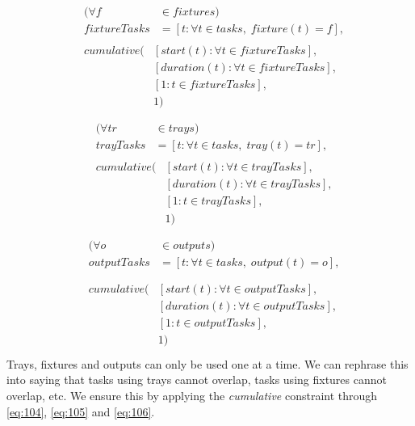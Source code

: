  \begin{equation}
 \begin{aligned}\label{eq:104}
 &\begin{aligned}
 (\forall f &\in fixtures) \\
 fixtureTasks &= [t : \forall t \in tasks, \; fixture(t) = f], 
 \end{aligned}\\
 &\begin{aligned}
 cumulative(&[start(t) : \forall t \in fixtureTasks],\\
 &[duration(t) : \forall t \in fixtureTasks],\\
 &[1 : t \in fixtureTasks],\\
 &1)
 \end{aligned}\\
 \end{aligned}
 \end{equation}
 \begin{equation}
 \begin{aligned}\label{eq:105}
 &\begin{aligned}
 (\forall tr &\in trays) \\
 trayTasks &= [t : \forall t \in tasks, \; tray(t) = tr], 
 \end{aligned}\\
 &\begin{aligned}
 cumulative(&[start(t) : \forall t \in trayTasks],\\
 &[duration(t) : \forall t \in trayTasks],\\
 &[1 : t \in trayTasks],\\
 &1)
 \end{aligned}\\
 \end{aligned}
 \end{equation}
 \begin{equation}
 \begin{aligned}\label{eq:106}
 &\begin{aligned}
 (\forall o &\in outputs) \\
 outputTasks &= [t : \forall t \in tasks, \; output(t) = o], \\
 \end{aligned}\\
 &\begin{aligned}
 cumulative(&[start(t) : \forall t \in outputTasks], \\
 &[duration(t) : \forall t \in outputTasks], \\
 &[1 : t \in outputTasks], \\
 &1)
 \end{aligned}\\
 \end{aligned}
 \end{equation}
Trays, fixtures and outputs can only be used one at a time. We can rephrase this into saying that tasks using trays cannot overlap, tasks using fixtures cannot overlap, etc. We ensure this by applying the \emph{cumulative} constraint through \ref{eq:104}, \ref{eq:105} and \ref{eq:106}.
 

